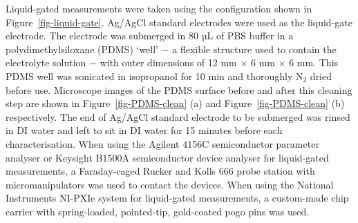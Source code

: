 \documentclass[
  a4paper,
]{scrbook}
\begin{document}
Liquid-gated measurements were taken using the configuration shown in
Figure~\ref{fig-liquid-gate}. Ag/AgCl standard electrodes were used as
the liquid-gate electrode. The electrode was submerged in 80 µL of PBS
buffer in a polydimethylsiloxane (PDMS) `well' \(-\) a flexible
structure used to contain the electrolyte solution \(-\) with outer
dimensions of 12 mm \(\times\) 6 mm \(\times\) 6 mm. This PDMS well was
sonicated in isopropanol for 10 min and thoroughly N\(_2\) dried before
use. Microscope images of the PDMS surface before and after this
cleaning step are shown in Figure~\ref{fig-PDMS-clean} (a) and
Figure~\ref{fig-PDMS-clean} (b) respectively. The end of Ag/AgCl
standard electrode to be submerged was rinsed in DI water and left to
sit in DI water for 15 minutes before each characterisation. When using
the Agilent 4156C semiconductor parameter analyser or Keysight B1500A
semiconductor device analyser for liquid-gated measurements, a
Faraday-caged Rucker and Kolls 666 probe station with micromanipulators
was used to contact the devices. When using the National Instruments
NI-PXIe system for liquid-gated measurements, a custom-made chip carrier
with spring-loaded, pointed-tip, gold-coated pogo pins was used.
\end{document}
